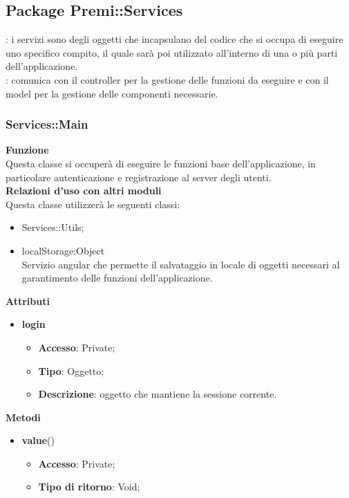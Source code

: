 \subsection {Package Premi::Services}
\label{sec:services}
\textbf{\tipo}: i servizi sono degli oggetti che incapsulano del codice che si occupa di eseguire uno specifico compito, il quale sarà poi utilizzato all’interno di una o più parti dell’applicazione.\\
\textbf{\relaz}: comunica con il controller per la gestione delle funzioni da eseguire e con il model per la gestione delle componenti necessarie.\\
\subsubsection{Services::Main}{
		\label{sub:servicesMain}
		\textbf{Funzione}\\
		\indent Questa classe si occuperà di eseguire le funzioni base dell'applicazione, in particolare autenticazione e registrazione al server degli utenti.\\
		\textbf{Relazioni d'uso con altri moduli}\\
		\indent Questa classe utilizzerà le seguenti classi:
		\begin{itemize}
			\item Services::Utils;
			\item localStorage:Object\\
				\indent Servizio angular che permette il salvataggio in locale di oggetti necessari al garantimento delle funzioni dell'applicazione.
		\end{itemize}
		\textbf{Attributi}
		\begin{itemize}
			\item \textbf{login}
			\begin{itemize}
				\item \textbf{Accesso}: Private;
				\item \textbf{Tipo}: Oggetto;
				\item \textbf{Descrizione}: oggetto che mantiene la sessione corrente.
			\end{itemize}
		\end{itemize}
		\textbf{Metodi}
		\begin{itemize}
			\item \textbf{value}()
			\begin{itemize}
				\item \textbf{Accesso}: Private;
				\item \textbf{Tipo di ritorno}: Void;

\end{itemize}
\end{itemize}}
